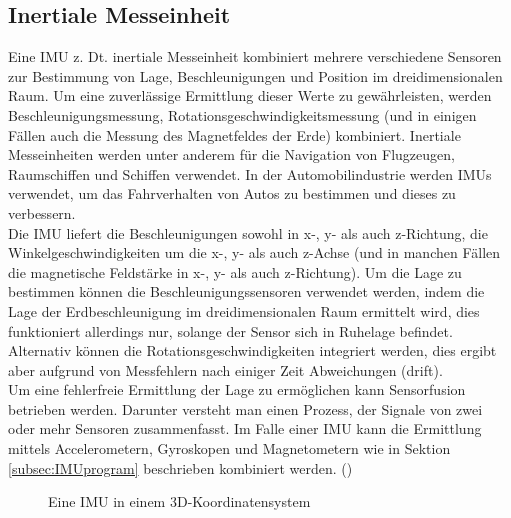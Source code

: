 \subsection{Inertiale Messeinheit}
\label{subsec:tIMU}
Eine \ac{IMU} z. Dt. inertiale Messeinheit kombiniert mehrere verschiedene Sensoren zur Bestimmung von Lage, Beschleunigungen und Position im dreidimensionalen Raum. Um eine zuverlässige Ermittlung dieser Werte zu gewährleisten, werden Beschleunigungsmessung, Rotationsgeschwindigkeitsmessung (und in einigen Fällen auch die Messung des Magnetfeldes der Erde) kombiniert. Inertiale Messeinheiten werden unter anderem für die Navigation von Flugzeugen, Raumschiffen und Schiffen verwendet. In der Automobilindustrie werden \ac{IMU}s verwendet, um das Fahrverhalten von Autos zu bestimmen und dieses zu verbessern.\\
Die \ac{IMU} liefert die Beschleunigungen sowohl in x-, y- als auch z-Richtung, die Winkelgeschwindigkeiten um die x-, y- als auch z-Achse (und in manchen Fällen die magnetische Feldstärke in x-, y- als auch z-Richtung). Um die Lage zu bestimmen können die Beschleunigungssensoren verwendet werden, indem die Lage der Erdbeschleunigung im dreidimensionalen Raum ermittelt wird, dies funktioniert allerdings nur, solange der Sensor sich in Ruhelage befindet. Alternativ können die Rotationsgeschwindigkeiten integriert werden, dies ergibt aber aufgrund von Messfehlern nach einiger Zeit Abweichungen (drift).\\ Um eine fehlerfreie Ermittlung der Lage zu ermöglichen kann Sensorfusion betrieben werden. Darunter versteht man einen Prozess, der Signale von zwei oder mehr Sensoren zusammenfasst. Im Falle einer \ac{IMU} kann die Ermittlung mittels Accelerometern, Gyroskopen und Magnetometern wie in Sektion \ref{subsec:IMUprogram} beschrieben kombiniert werden.
(\cite{UCAM-CL-TR-696})
\begin{figure}[h]
\centering
\missingfigure{}
\caption{Eine \ac{IMU} in einem \ac{3D}-Koordinatensystem}
\label{fig:IMU3D}
\end{figure}

